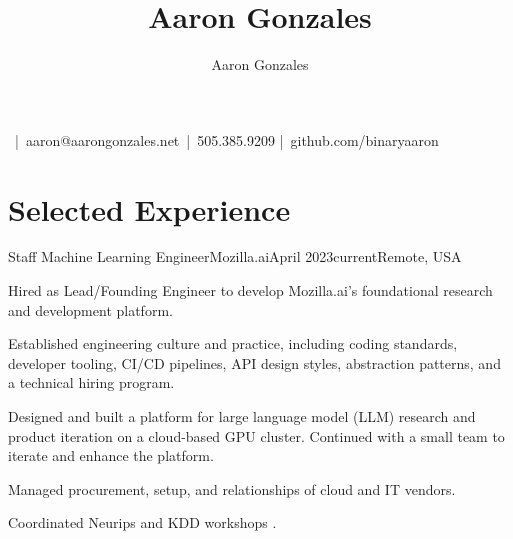 \documentclass[print]{ag-cv} %
\title{Aaron Gonzales}
\author{Aaron Gonzales}
\makeatletter
\renewcommand\maketitle{
{\raggedright %

{\headingfont \bfseries \@title }{\smallheaderfont~|~aaron@aarongonzales.net~|~505.385.9209 |~github.com/binaryaaron}
}} %
\makeatother
\begin{document}
\pagestyle{fancy}
\fancyhf{}
\fancyhead{}
\fancyfoot{}
\cfoot{}
\renewcommand{\headrulewidth}{0pt}
\renewcommand{\footrulewidth}{0pt}
\maketitle

\raggedright
\section*{Selected Experience}

\begin{job}
  {}{Staff Machine Learning Engineer}{Mozilla.ai}{April 2023}{current}{Remote, USA}{
    Hired as Lead/Founding Engineer to develop Mozilla.ai's foundational research and development platform.
    

    \begin{myitemize}
      \item Established engineering culture and practice, including coding standards, developer tooling, CI/CD
      pipelines, API design styles, abstraction patterns, and a technical hiring program.

      \item Designed and built a platform for large language model (LLM) research and product iteration on a
      cloud-based GPU cluster. Continued with a small team to iterate and enhance the platform.

      \item Managed procurement, setup, and relationships of cloud and IT vendors.
      \item Coordinated Neurips and KDD workshops \autocite{kdd_2023_workshop,neurips_llm_efficiency_2023}.


    \end{myitemize}
  }
\end{job}
\end{document}
